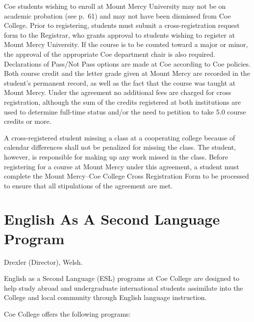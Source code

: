 \documentclass[
  letterpaper,
]{scrbook}
\begin{document}
Coe students wishing to enroll at Mount Mercy University may not be on
academic probation (see p.~61) and may not have been dismissed from Coe
College. Prior to registering, students must submit a cross-registration
request form to the Registrar, who grants approval to students wishing
to register at Mount Mercy University. If the course is to be counted
toward a major or minor, the approval of the appropriate Coe department
chair is also required. Declarations of Pass/Not Pass options are made
at Coe according to Coe policies. Both course credit and the letter
grade given at Mount Mercy are recorded in the student's permanent
record, as well as the fact that the course was taught at Mount Mercy.
Under the agreement no additional fees are charged for cross
registration, although the sum of the credits registered at both
institutions are used to determine full-time status and/or the need to
petition to take 5.0 course credits or more.

A cross-registered student missing a class at a cooperating college
because of calendar differences shall not be penalized for missing the
class. The student, however, is responsible for making up any work
missed in the class. Before registering for a course at Mount Mercy
under this agreement, a student must complete the Mount Mercy--Coe
College Cross Registration Form to be processed to ensure that all
stipulations of the agreement are met.

\hypertarget{english-as-a-second-language-program}{%
\section{English As A Second Language
Program}\label{english-as-a-second-language-program}}

Drexler (Director), Welsh.

English as a Second Language (ESL) programs at Coe College are designed
to help study abroad and undergraduate international students assimilate
into the College and local community through English language
instruction.

Coe College offers the following programs:
\end{document}
